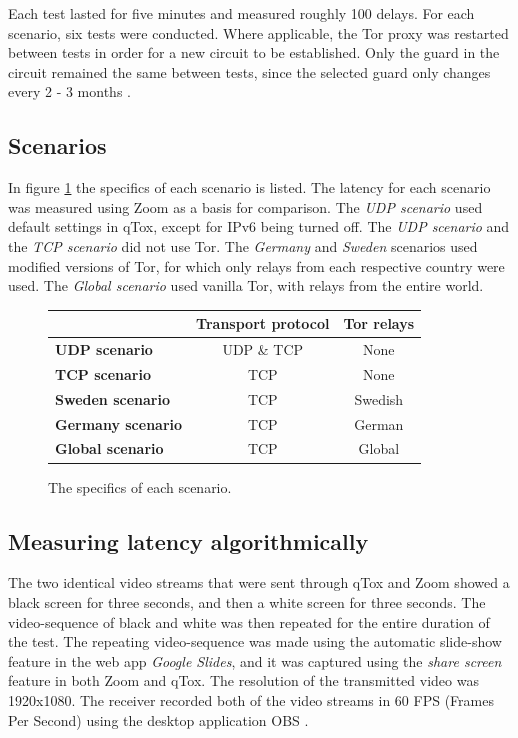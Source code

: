 \documentclass{kththesis}
\begin{document}
Each test lasted for five minutes and measured roughly 100 delays. For each scenario, six tests were conducted. Where applicable, the Tor proxy was restarted between tests in order for a new circuit to be established. Only the guard in the circuit remained the same between tests, since the selected guard only changes every 2 - 3 months \parencite{TorGuard}.

\subsection{Scenarios}
In figure \ref{table:scenariosTable} the specifics of each scenario is listed. The latency for each scenario was measured using Zoom as a basis for comparison. The \emph{UDP scenario} used default settings in qTox, except for IPv6 being turned off. The \emph{UDP scenario} and the \emph{TCP scenario} did not use Tor. The \emph{Germany} and \emph{Sweden} scenarios used modified versions of Tor, for which only relays from each respective country were used. The \emph{Global scenario} used vanilla Tor, with relays from the entire world.

\begin{figure}[!htb]
    \centering
    \begin{center}
    \begin{tabular}{ | l | c | c |}  
        \cline{2-3}
        \multicolumn{1}{l|}{} & Transport protocol & Tor relays \\ [0.5ex]
        \hline
        \textbf{UDP scenario}       & UDP \& TCP & None \\
        \hline
        \textbf{TCP scenario}       & TCP & None \\
        \hline
        \textbf{Sweden scenario}    & TCP & Swedish \\
        \hline
        \textbf{Germany scenario}   & TCP & German \\
        \hline
        \textbf{Global scenario}    & TCP & Global \\
        \hline
    \end{tabular}
    \caption{The specifics of each scenario.}
    \label{table:scenariosTable}
    \end{center}
\end{figure}

\subsection{Measuring latency algorithmically}
\label{section:measuringlatency}
The two identical video streams that were sent through qTox and Zoom showed a black screen for three seconds, and then a white screen for three seconds. The video-sequence of black and white was then repeated for the entire duration of the test. The repeating video-sequence was made using the automatic slide-show feature in the web app \emph{Google Slides}, and it was captured using the \emph{share screen} feature in both Zoom and qTox. The resolution of the transmitted video was 1920x1080. The receiver recorded both of the video streams in 60 FPS (Frames Per Second) using the desktop application OBS \parencite{OBS}.
\end{document}
